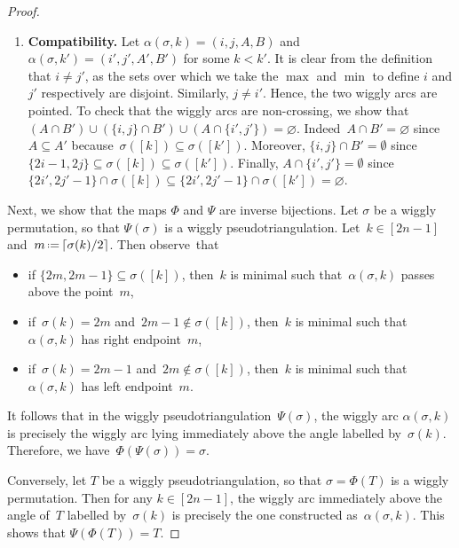 \documentclass{amsart}
\theoremstyle{definition}
\newcommand{\eqdef}{\mbox{\,\raisebox{0.2ex}{\scriptsize\ensuremath{\mathrm:}}\ensuremath{=}\,}} %
\begin{document}
\begin{proof}
\begin{enumerate}
\item \textbf{Compatibility.}
Let $\alpha(\sigma, k) = (i,j,A,B)$ and $\alpha(\sigma, k') = (i',j',A',B')$ for some \(k < k'\).
It is clear from the definition that \(i \neq j'\), as the sets over which we take the $\max$ and $\min$ to define \(i\) and \(j'\) respectively are disjoint.
Similarly, \(j \neq i'\).
Hence, the two wiggly arcs are pointed.
To check that the wiggly arcs are non-crossing, we show that~$(A \cap B') \cup (\{i,j\} \cap B') \cup (A \cap \{i',j'\}) = \varnothing$.
Indeed~$A \cap B' = \varnothing$ since~$A \subseteq A'$ because~$\sigma([k]) \subseteq \sigma([k'])$.
Moreover, \(\{i,j\} \cap B' = \emptyset\) since~\(\{2i - 1, 2j\} \subseteq \sigma([k]) \subseteq \sigma([k'])\).
Finally, \(A \cap \{i',j'\} = \emptyset\) since~\(\{2i', 2j'-1\} \cap \sigma([k]) \subseteq \{2i', 2j'-1\} \cap \sigma([k']) = \varnothing\).
\end{enumerate}

Next, we show that the maps \(\Phi\) and \(\Psi\) are inverse bijections.
Let \(\sigma\) be a wiggly permutation, so that \(\Psi(\sigma)\) is a wiggly pseudotriangulation.
Let~$k \in [2n-1]$ and~$m \eqdef \lceil \sigma(k)/2 \rceil$.
Then observe~that
\begin{itemize}
\item if $\{2m, 2m-1\} \subseteq \sigma([k])$, then~$k$ is minimal such that~$\alpha(\sigma,k)$ passes above the point~$m$,
\item if~$\sigma(k) = 2m$ and~$2m-1 \notin \sigma([k])$, then~$k$ is minimal such that~$\alpha(\sigma,k)$ has right endpoint~$m$,
\item if~$\sigma(k) = 2m-1$ and~$2m \notin \sigma([k])$, then~$k$ is minimal such that~$\alpha(\sigma,k)$ has left endpoint~$m$.
\end{itemize}
It follows that in the wiggly pseudotriangulation~\(\Psi(\sigma)\), the wiggly arc \(\alpha(\sigma, k)\) is precisely the wiggly arc lying immediately above the angle labelled by~\(\sigma(k)\).
Therefore, we have~\(\Phi(\Psi(\sigma)) = \sigma\).

Conversely, let \(T\) be a wiggly pseudotriangulation, so that \(\sigma = \Phi(T)\) is a wiggly permutation.
Then for any \(k \in [2n-1]\), the wiggly arc immediately above the angle of~$T$ labelled by~$\sigma(k)$ is precisely the one constructed as~\(\alpha(\sigma, k)\).
This shows that \(\Psi(\Phi(T)) = T\).


\end{proof}
\end{document}
